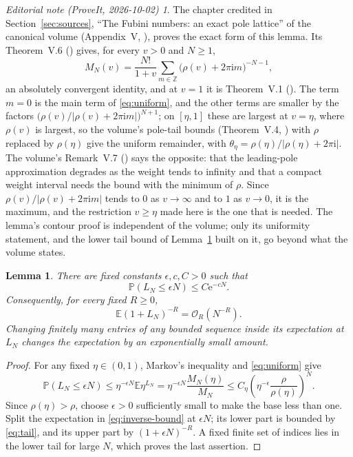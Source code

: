 \documentclass[11pt,letterpaper]{article}
\numberwithin{equation}{section}
\newtheorem{lemma}[theorem]{Lemma}
\theoremstyle{remark}\newtheorem{remark}[theorem]{Remark}
\newtheorem*{ednote}{Editorial note (ProveIt, 2026-10-02)}
\newcommand{\E}{\mathbb E}
\newcommand{\Prob}{\mathbb P}
\newcommand{\ii}{\mathrm i}
\newcommand{\e}{\mathrm e}
\newcommand{\Ord}{\mathcal O}
\begin{document}
\begin{ednote}
The chapter credited in Section~\ref{sec:sources}, ``The Fubini numbers: an exact pole lattice'' of the canonical volume \cite{proveit} (Appendix~V, ), proves the exact form of this lemma. Its Theorem~V.6 () gives, for every $v>0$ and $N\ge1$,
\[
 M_N(v)=\frac{N!}{1+v}\sum_{m\in\mathbb Z}\bigl(\rho(v)+2\pi\ii m\bigr)^{-N-1},
\]
an absolutely convergent identity, and at $v=1$ it is Theorem~V.1 (). The term $m=0$ is the main term of \eqref{eq:uniform}, and the other terms are smaller by the factors $\bigl(\rho(v)/|\rho(v)+2\pi\ii m|\bigr)^{N+1}$; on $[\eta,1]$ these are largest at $v=\eta$, where $\rho(v)$ is largest, so the volume's pole-tail bounds (Theorem~V.4, ) with $\rho$ replaced by $\rho(\eta)$ give the uniform remainder, with $\theta_\eta=\rho(\eta)/|\rho(\eta)+2\pi\ii|$. The volume's Remark~V.7 () says the opposite: that the leading-pole approximation degrades as the weight tends to infinity and that a compact weight interval needs the bound with the minimum of $\rho$. Since $\rho(v)/|\rho(v)+2\pi\ii m|$ tends to $0$ as $v\to\infty$ and to $1$ as $v\to0$, it is the maximum, and the restriction $v\ge\eta$ made here is the one that is needed. The lemma's contour proof is independent of the volume; only its uniformity statement, and the lower tail bound of Lemma~\ref{lem:tail} built on it, go beyond what the volume states.
\end{ednote}

\begin{lemma}\label{lem:tail}
There are fixed constants $\epsilon,c,C>0$ such that
\begin{equation}\label{eq:tail}
 \Prob(L_N\le\epsilon N)\le C\e^{-cN}.
\end{equation}
Consequently, for every fixed $R\ge0$,
\begin{equation}\label{eq:inverse-bound}
 \E(1+L_N)^{-R}=\Ord_R(N^{-R}).
\end{equation}
Changing finitely many entries of any bounded sequence inside its expectation at $L_N$ changes the expectation by an exponentially small amount.
\end{lemma}
\begin{proof}
For any fixed $\eta\in(0,1)$, Markov's inequality and \eqref{eq:uniform} give
\[
 \Prob(L_N\le\epsilon N)
 \le\eta^{-\epsilon N}\E\eta^{L_N}
 =\eta^{-\epsilon N}\frac{M_N(\eta)}{M_N}
 \le C_\eta\left(\eta^{-\epsilon}\frac{\rho}{\rho(\eta)}\right)^N.
\]
Since $\rho(\eta)>\rho$, choose $\epsilon>0$ sufficiently small to make the base less than one. Split the expectation in \eqref{eq:inverse-bound} at $\epsilon N$; its lower part is bounded by \eqref{eq:tail}, and its upper part by $(1+\epsilon N)^{-R}$. A fixed finite set of indices lies in the lower tail for large $N$, which proves the last assertion.
\end{proof}
\end{document}
